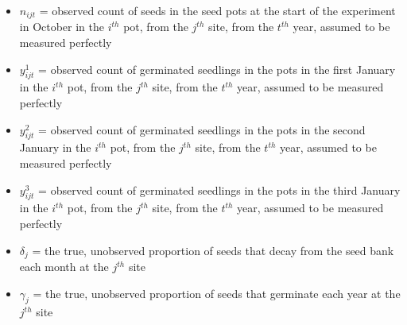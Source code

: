 \documentclass[12pt, oneside]{article}   	%
\begin{document}
\begin{itemize}
	\item $n_{ijt}$ = observed count of seeds in the seed pots at the start of the experiment in October in the $i^{th}$ pot, from the $j^{th}$ site, from the $t^{th}$ year, assumed to be measured perfectly 
	\item $y^1_{ijt}$ = observed count of germinated seedlings in the pots in the first January in the $i^{th}$ pot, from the $j^{th}$ site, from the $t^{th}$ year, assumed to be measured perfectly 
	\item $y^2_{ijt}$ = observed count of germinated seedlings in the pots in the second January in the $i^{th}$ pot, from the $j^{th}$ site, from the $t^{th}$ year, assumed to be measured perfectly 
	\item $y^3_{ijt}$ = observed count of germinated seedlings in the pots in the third January in the $i^{th}$ pot, from the $j^{th}$ site, from the $t^{th}$ year, assumed to be measured perfectly 
	\item $\delta_{j}$ = the true, unobserved proportion of seeds that decay from the seed bank each month at the $j^{th}$ site
	\item $\gamma_{j}$ = the true, unobserved proportion of seeds that germinate each year at the $j^{th}$ site
\end{itemize}
\end{document}
